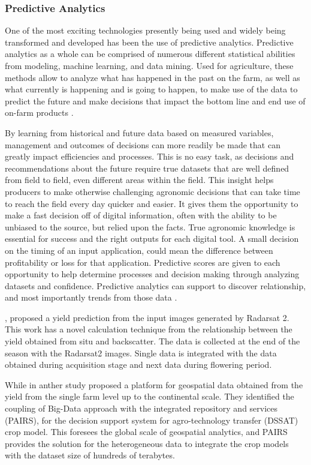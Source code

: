 \documentclass[review]{elsarticle}
\begin{document}
    \subsubsection{Predictive Analytics}
    One of the most exciting technologies presently being used and widely being transformed and developed has been the use of predictive analytics. Predictive analytics as a whole can be comprised of numerous different statistical abilities from modeling, machine learning, and data mining. Used for agriculture, these methods allow to analyze what has happened in the past on the farm, as well as what currently is happening and is going to happen, to make use of the data to predict the future and make decisions that impact the bottom line and end use of on-farm products \cite{Kamilaris_2017, Nguyen_2017}.

    By learning from historical and future data based on measured variables, management and outcomes of decisions can more readily be made that can greatly impact efficiencies and processes. This is no easy task, as decisions and recommendations about the future require true datasets that are well defined from field to field, even different areas within the field. This insight helps producers to make otherwise challenging agronomic decisions that can take time to reach the field every day quicker and easier. It gives them the opportunity to make a fast decision off of digital information, often with the ability to be unbiased to the source, but relied upon the facts. True agronomic knowledge is essential for success and the right outputs for each digital tool. A small decision on the timing of an input application, could mean the difference between profitability or loss for that application. Predictive scores are given to each opportunity to help determine processes and decision making through analyzing datasets and confidence. Predictive analytics can support to discover relationship, and most importantly trends from those data \cite{Zhang_2017}.

    \cite{Barbouchi_2016}, proposed a yield prediction from the input images generated by Radarsat 2. This work has a novel calculation technique from the relationship between the yield obtained from situ and backscatter. The data is collected at the end of the season with the Radarsat2 images. Single data is integrated with the data obtained during acquisition stage and next data during flowering period.

    While in anther study \cite{Badr_2016} proposed a platform for geospatial data obtained from the yield from the single farm level up to the continental scale. They identified the coupling of Big-Data approach with the integrated repository and services (PAIRS), for the decision support system for agro-technology transfer (DSSAT) crop model. This foresees the global scale of geospatial analytics, and PAIRS provides the solution for the heterogeneous data to integrate the crop models with the dataset size of hundreds of terabytes.
\end{document}
